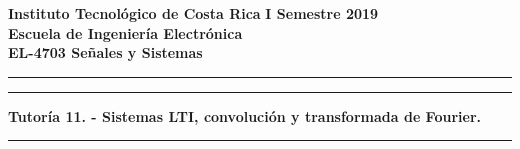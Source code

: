 
\onehalfspace
\noindent
\large\textbf{Instituto Tecnológico de Costa Rica} \hfill \textbf{I Semestre 2019} \\
\large\textbf{Escuela de Ingeniería Electrónica} \\
\large\textbf{EL-4703 Señales y Sistemas}

\noindent\rule[1mm]{\textwidth}{0.4pt}

\vspace{3mm}

\par\noindent\rule[-3mm]{\textwidth}{0.4pt}
\begin{center}
\Large\textbf{Tutoría 11. - Sistemas LTI, convolución y transformada de Fourier.}
\end{center}
\par\noindent\rule[6mm]{\textwidth}{0.4pt}

\vspace{2mm}

\setlength\parskip{3mm}

